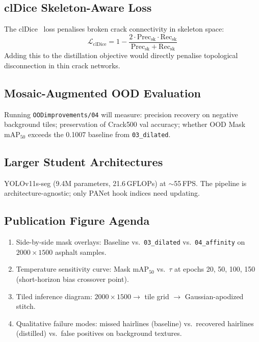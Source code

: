 \documentclass[12pt,a4paper]{article}
\begin{document}
\subsection{clDice Skeleton-Aware Loss}

The clDice~\cite{shit2021cldice} loss penalises broken crack connectivity in
skeleton space:
\[
\mathcal{L}_\text{clDice}=1-\frac{2\cdot\mathrm{Prec}_\text{sk}\cdot\mathrm{Rec}_\text{sk}}
                                    {\mathrm{Prec}_\text{sk}+\mathrm{Rec}_\text{sk}}
\]
Adding this to the distillation objective would directly penalise topological
disconnection in thin crack networks.

\subsection{Mosaic-Augmented OOD Evaluation}

Running \texttt{OODimprovements/04} will measure: precision recovery on negative
background tiles; preservation of Crack500 val accuracy; whether OOD Mask
mAP$_{50}$ exceeds the 0.1007 baseline from \texttt{03\_dilated}.

\subsection{Larger Student Architectures}

YOLOv11s-seg (9.4M parameters, 21.6\,GFLOPs) at $\sim$55\,FPS.
The pipeline is architecture-agnostic; only PANet hook indices need updating.

\subsection{Publication Figure Agenda}

\begin{enumerate}
  \item Side-by-side mask overlays: Baseline vs.\ \texttt{03\_dilated} vs.\
    \texttt{04\_affinity} on $2000\times1500$ asphalt samples.
  \item Temperature sensitivity curve: Mask mAP$_{50}$ vs.\ $\tau$ at epochs
    20, 50, 100, 150 (short-horizon bias crossover point).
  \item Tiled inference diagram: $2000\times1500\to$ tile grid $\to$
    Gaussian-apodized stitch.
  \item Qualitative failure modes: missed hairlines (baseline) vs.\ recovered
    hairlines (distilled) vs.\ false positives on background textures.
\end{enumerate}
\end{document}
